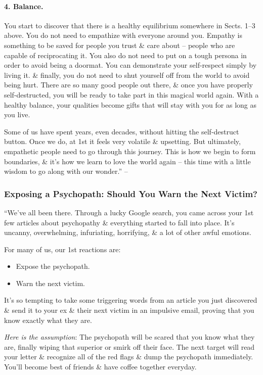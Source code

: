 \documentclass{article}
\numberwithin{equation}{section}
\begin{document}
\paragraph{4. Balance.} You start to discover that there is a healthy equilibrium somewhere in Sects. 1--3 above. You do not need to empathize with everyone around you. Empathy is something to be saved for people you trust \& care about -- people who are capable of reciprocating it. You also do not need to put on a tough persona in order to avoid being a doormat. You can demonstrate your self-respect simply by living it. \& finally, you do not need to shut yourself off from the world to avoid being hurt. There are so many good people out there, \& once you have properly self-destructed, you will be ready to take part in this magical world again. With a healthy balance, your qualities become gifts that will stay with you for as long as you live.

Some of us have spent years, even decades, without hitting the self-destruct button. Once we do, at 1st it feels very volatile \& upsetting. But ultimately, empathetic people need to go through this journey. This is how we begin to form boundaries, \& it's how we learn to love the world again -- this time with a little wisdom to go along with our wonder.'' -- \cite[pp. 124--126]{MacKenzie2015}

\subsubsection{Exposing a Psychopath: Should You Warn the Next Victim?}
``We've all been there. Through a lucky Google search, you came across your 1st few articles about psychopathy \& everything started to fall into place. It's uncanny, overwhelming, infuriating, horrifying, \& a lot of other awful emotions.

For many of us, our 1st reactions are:
\begin{itemize}
	\item Expose the psychopath.
	\item Warn the next victim.
\end{itemize}
It's so tempting to take some triggering words from an article you just discovered \& send it to your ex \&  their next victim in an impulsive email, proving that you know exactly what they are.

\textit{Here is the assumption}: The psychopath will be scared that you know what they are, finally wiping that superior or smirk off their face. The next target will read your letter \& recognize all of the red flags \& dump the psychopath immediately. You'll become best of friends \& have coffee together everyday.
\end{document}
